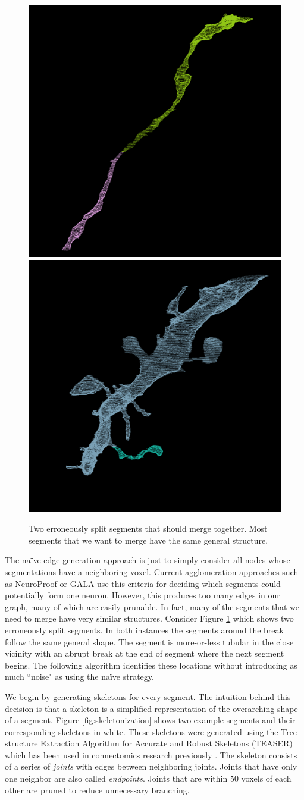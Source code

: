 \begin{figure}[t]
	\centering
	\includegraphics[width=0.42\linewidth]{./figures/merge_candidate1.png}
	\hspace{0.085\linewidth}
	\includegraphics[width=0.42\linewidth]{./figures/merge_candidate2.png}
	\caption{Two erroneously split segments that should merge together. Most segments that we want to merge have the same general structure.}
	\label{fig:merge_candidates}
\end{figure}


The na\"ive edge generation approach is just to simply consider all nodes whose segmentations have a neighboring voxel. Current agglomeration approaches such as NeuroProof or GALA use this criteria for deciding which segments could potentially form one neuron. However, this produces too many edges in our graph, many of which are easily prunable. In fact, many of the segments that we need to merge have very similar structures. Consider Figure \ref{fig:merge_candidates} which shows two erroneously split segments. In both instances the segments around the break follow the same general shape. The segment is more-or-less tubular in the close vicinity with an abrupt break at the end of segment where the next segment begins. The following algorithm identifies these locations without introducing as much ``noise" as using the na\"ive strategy. 

We begin by generating skeletons for every segment. The intuition behind this decision is that a skeleton is a simplified representation of the overarching shape of a segment. Figure \ref{fig:skeletonization} shows two example segments and their corresponding skeletons in white. These skeletons were generated using the Tree-structure Extraction Algorithm for Accurate and Robust Skeletons (TEASER) \cite{sato2000teasar} which has been used in connectomics research previously \cite{zhao2014automatic}. The skeleton consists of a series of \textit{joints} with edges between neighboring joints. Joints that have only one neighbor are also called \textit{endpoints}. Joints that are within $50$ voxels of each other are pruned to reduce unnecessary branching. 

